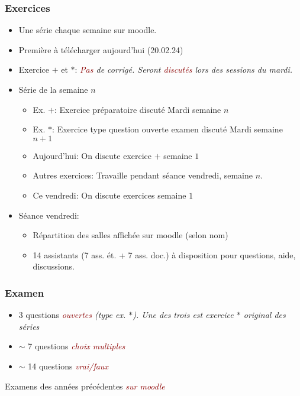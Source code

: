 \documentclass[t,aspectratio=149,mathserif]{beamer}
\newcommand{\myemph}[1]{\em \textcolor{darkred}{#1}}
\newcommand{\Platz}{\vspace{1cm}}
\begin{document}
   \begin{frame}
     \frametitle{Exercices}

     \begin{itemize}
     \item Une série chaque semaine sur moodle.
     \item Première à télécharger  aujourd'hui (20.02.24)
     \item Exercice $+$ et $*$: \myemph{Pas} de corrigé. Seront \myemph{discutés} lors des sessions du mardi.
     \item Série de la semaine $n$
       \begin{itemize}
       \item Ex. $+$: Exercice préparatoire discuté Mardi semaine $n$
       \item Ex. $*$: Exercice type question ouverte examen   discuté Mardi semaine $n+1$
       \item Aujourd'hui: On discute exercice $+$ semaine $1$
       \item Autres exercices: Travaille pendant séance vendredi, semaine $n$.
       \item Ce vendredi: On discute exercices semaine $1$
       \end{itemize}
     \item Séance vendredi:
       \begin{itemize}
       \item Répartition des salles affichée sur moodle (selon nom)
       \item 14 assistants (7 ass. ét. + 7 ass. doc.) à disposition pour questions, aide, discussions. 
       \end{itemize}
       
     \end{itemize}
     
   \end{frame}

   \begin{frame}
     \frametitle{Examen}

     \begin{itemize}
     \item 3 questions \myemph{ouvertes} (type ex. $*$). Une des trois est exercice $*$ original des séries
     \item $∼$ 7 questions  \myemph{choix multiples} 
     \item  $∼$ 14 questions \myemph{vrai/faux}     
     \end{itemize}

     \Platz

     Examens des années précédentes  \myemph{sur moodle}
   \end{frame}
\end{document}
